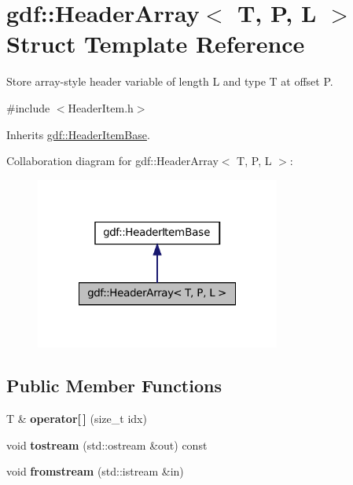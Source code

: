 \hypertarget{structgdf_1_1_header_array}{
\section{gdf::HeaderArray$<$ T, P, L $>$ Struct Template Reference}
\label{structgdf_1_1_header_array}
}


Store array-\/style header variable of length L and type T at offset P.  




{\ttfamily \#include $<$HeaderItem.h$>$}



Inherits \hyperlink{structgdf_1_1_header_item_base}{gdf::HeaderItemBase}.



Collaboration diagram for gdf::HeaderArray$<$ T, P, L $>$:
\nopagebreak
\begin{figure}[H]
\begin{center}
\leavevmode
\includegraphics[width=228pt]{structgdf_1_1_header_array__coll__graph}
\end{center}
\end{figure}
\subsection*{Public Member Functions}
\begin{DoxyCompactItemize}
\item 
\hypertarget{structgdf_1_1_header_array_adddb102068fd68a0b7716cd9d64f2632}{
T \& {\bfseries operator\mbox{[}$\,$\mbox{]}} (size\_\-t idx)}
\label{structgdf_1_1_header_array_adddb102068fd68a0b7716cd9d64f2632}

\item 
\hypertarget{structgdf_1_1_header_array_ab336e83345a08541e45e86955c8d99e9}{
void {\bfseries tostream} (std::ostream \&out) const }
\label{structgdf_1_1_header_array_ab336e83345a08541e45e86955c8d99e9}

\item 
\hypertarget{structgdf_1_1_header_array_a249dba3a397de6f89b0a5e0c7c8257c0}{
void {\bfseries fromstream} (std::istream \&in)}
\label{structgdf_1_1_header_array_a249dba3a397de6f89b0a5e0c7c8257c0}

\end{DoxyCompactItemize}

